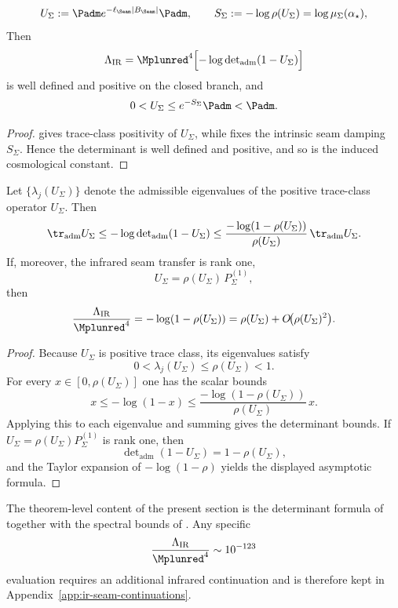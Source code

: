 \begin{theorem}
\label{thm:cosmology-closure}
\[
U_\Sigma:=\Padm e^{-\ell_\Seam |B_\Seam|}\Padm,
\qquad
S_\Sigma:=-\log\rho(U_\Sigma)=\log\mu_\Sigma(\alpha_\star),
\]
Then
\[
\Lambda_{\mathrm{IR}}
=
\Mplunred^4
\Bigl[-\log\det\nolimits_{\mathrm{adm}}(1-U_\Sigma)\Bigr]
\]
is well defined and positive on the closed branch, and
\[
0<U_\Sigma\le e^{-S_\Sigma}\Padm<\Padm.
\]
\end{theorem}

\begin{proof}
 gives trace-class positivity of
$U_\Sigma$, while  fixes the intrinsic seam damping $S_\Sigma$.
Hence the determinant is well defined and positive, and so is the induced cosmological constant.
\end{proof}

\begin{corollary}
\label{cor:ir-seam-transfer-bounds}
Let $\{\lambda_j(U_\Sigma)\}$ denote the admissible eigenvalues of the positive trace-class
operator $U_\Sigma$. Then
\[
\tr_{\mathrm{adm}}U_\Sigma
\le
-\log\det\nolimits_{\mathrm{adm}}(1-U_\Sigma)
\le
\frac{-\log(1-\rho(U_\Sigma))}{\rho(U_\Sigma)}\,\tr_{\mathrm{adm}}U_\Sigma.
\]
If, moreover, the infrared seam transfer is rank one,
\[
U_\Sigma=\rho(U_\Sigma)\,P_\Sigma^{(1)},
\]
then
\[
\frac{\Lambda_{\mathrm{IR}}}{\Mplunred^4}
=
-\log(1-\rho(U_\Sigma))
=
\rho(U_\Sigma)+O\!\bigl(\rho(U_\Sigma)^2\bigr).
\]
\end{corollary}

\begin{proof}
Because $U_\Sigma$ is positive trace class, its eigenvalues satisfy
\[
0<\lambda_j(U_\Sigma)\le \rho(U_\Sigma)<1.
\]
For every $x\in[0,\rho(U_\Sigma)]$ one has the scalar bounds
\[
x\le -\log(1-x)\le \frac{-\log(1-\rho(U_\Sigma))}{\rho(U_\Sigma)}\,x.
\]
Applying this to each eigenvalue and summing gives the determinant bounds. If
$U_\Sigma=\rho(U_\Sigma)P_\Sigma^{(1)}$ is rank one, then
\[
\det\nolimits_{\mathrm{adm}}(1-U_\Sigma)=1-\rho(U_\Sigma),
\]
and the Taylor expansion of $-\log(1-\rho)$ yields the displayed asymptotic formula.
\end{proof}

\begin{remark}
The theorem-level content of the present section is the determinant formula of
 together with the spectral bounds of
. Any specific
\[
\frac{\Lambda_{\mathrm{IR}}}{\Mplunred^4}\sim 10^{-123}
\]
evaluation requires an additional infrared continuation and is therefore kept in
Appendix~\ref{app:ir-seam-continuations}.
\end{remark}

